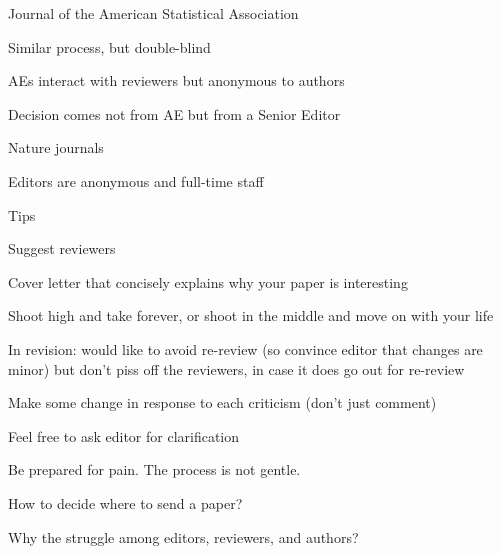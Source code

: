 \documentclass[aspectratio=169,12pt,t]{beamer}
\begin{document}
\begin{frame}{Journal of the American Statistical Association}

  \bbi
\item Similar process, but {\hilit double-blind}
\item AEs interact with reviewers but anonymous to authors
\item Decision comes not from AE but from a Senior Editor
  \ei


\end{frame}


\begin{frame}{Nature journals}

  \bbi
\item Editors are anonymous and full-time staff
  \ei


\end{frame}



\begin{frame}{Tips}

  {\footnotesize

  \bi
  \item Suggest reviewers
  \item Cover letter that concisely explains why your paper is
    interesting
  \item Shoot high and take forever, or
    shoot in the middle and move on with your life
  \item In revision: would like to avoid re-review (so convince editor
    that changes are minor) but don't piss off the reviewers, in case it
    does go out for re-review
  \item Make {\hilit some} change in response to each criticism
    (don't just comment)
  \item Feel free to ask editor for clarification
  \item Be prepared for pain. The process is not gentle.
  \ei
}
\end{frame}



\begin{frame}[c]{}

\centering

{\large \color{title} How to decide where to send a paper?}

\bigskip \bigskip
\bigskip \bigskip

{\large \color{title} Why the struggle among editors, reviewers, and authors?}

\end{frame}
\end{document}
